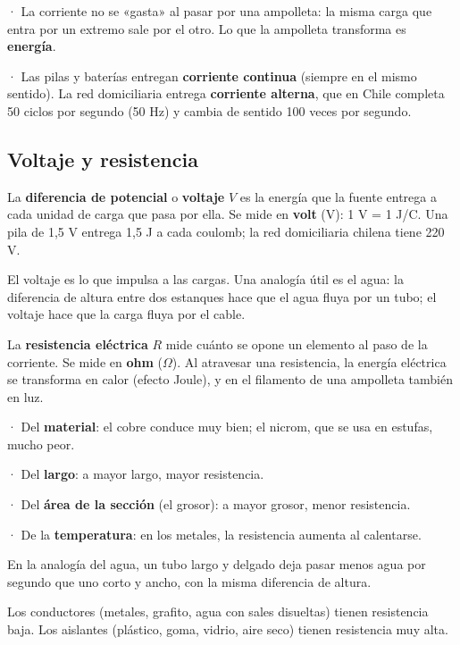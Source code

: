\begin{clave}[{Recuerda}] · La corriente no se «gasta» al pasar por una ampolleta: la misma carga que entra por un extremo sale por el otro. Lo que la ampolleta transforma es \textbf{energía}.\par · Las pilas y baterías entregan \textbf{corriente continua} (siempre en el mismo sentido). La red domiciliaria entrega \textbf{corriente alterna}, que en Chile completa 50 ciclos por segundo (50 Hz) y cambia de sentido 100 veces por segundo.\end{clave}
\subsection{Voltaje y resistencia}
La \textbf{diferencia de potencial} o \textbf{voltaje} $V$ es la energía que la fuente entrega a cada unidad de carga que pasa por ella. Se mide en \textbf{volt} (V): 1 V = 1 J/C. Una pila de 1,5 V entrega 1,5 J a cada coulomb; la red domiciliaria chilena tiene 220 V.

 

El voltaje es lo que impulsa a las cargas. Una analogía útil es el agua: la diferencia de altura entre dos estanques hace que el agua fluya por un tubo; el voltaje hace que la carga fluya por el cable.

 

La \textbf{resistencia eléctrica} $R$ mide cuánto se opone un elemento al paso de la corriente. Se mide en \textbf{ohm} (\ensuremath{\Omega}). Al atravesar una resistencia, la energía eléctrica se transforma en calor (efecto Joule), y en el filamento de una ampolleta también en luz.

  
\begin{clave} · Del \textbf{material}: el cobre conduce muy bien; el nicrom, que se usa en estufas, mucho peor.\par · Del \textbf{largo}: a mayor largo, mayor resistencia.\par · Del \textbf{área de la sección} (el grosor): a mayor grosor, menor resistencia.\par · De la \textbf{temperatura}: en los metales, la resistencia aumenta al calentarse.\end{clave}
 

En la analogía del agua, un tubo largo y delgado deja pasar menos agua por segundo que uno corto y ancho, con la misma diferencia de altura.

 
\begin{clave}[{Recuerda}] Los conductores (metales, grafito, agua con sales disueltas) tienen resistencia baja. Los aislantes (plástico, goma, vidrio, aire seco) tienen resistencia muy alta.\end{clave}
